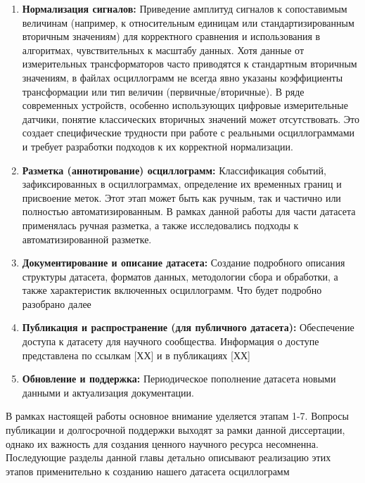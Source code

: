 \begin{enumerate}[label=\arabic*),itemsep=0pt,topsep=2pt]
  \item \textbf{Нормализация сигналов:} Приведение амплитуд сигналов к сопоставимым величинам (например, к относительным единицам или стандартизированным вторичным значениям) для корректного сравнения и использования в алгоритмах, чувствительных к масштабу данных. Хотя данные от измерительных трансформаторов часто приводятся к стандартным вторичным значениям, в файлах осциллограмм не всегда явно указаны коэффициенты трансформации или тип величин (первичные/вторичные). В ряде современных устройств, особенно использующих цифровые измерительные датчики, понятие классических вторичных значений может отсутствовать. Это создает специфические трудности при работе с реальными осциллограммами и требует разработки подходов к их корректной нормализации.
  \item \textbf{Разметка (аннотирование) осциллограмм:} Классификация событий, зафиксированных в осциллограммах, определение их временных границ и присвоение меток. Этот этап может быть как ручным, так и частично или полностью автоматизированным. В рамках данной работы для части датасета применялась ручная разметка, а также исследовались подходы к автоматизированной разметке.
  \item \textbf{Документирование и описание датасета:} Создание подробного описания структуры датасета, форматов данных, методологии сбора и обработки, а также характеристик включенных осциллограмм. Что будет подробно разобрано далее
  \item \textbf{Публикация и распространение (для публичного датасета):} Обеспечение доступа к датасету для научного сообщества. Информация о доступе представлена по ссылкам [ХХ] и в публикациях [ХХ]
  \item \textbf{Обновление и поддержка:} Периодическое пополнение датасета новыми данными и актуализация документации.
\end{enumerate}\par\vspace{0.2cm}

В рамках настоящей работы основное внимание уделяется этапам 1-7. Вопросы публикации и
долгосрочной поддержки выходят за рамки данной диссертации, однако их важность для
создания ценного научного ресурса несомненна. Последующие разделы данной главы детально
описывают реализацию этих этапов применительно к созданию нашего датасета
осциллограмм\par\vspace{0.2cm}

